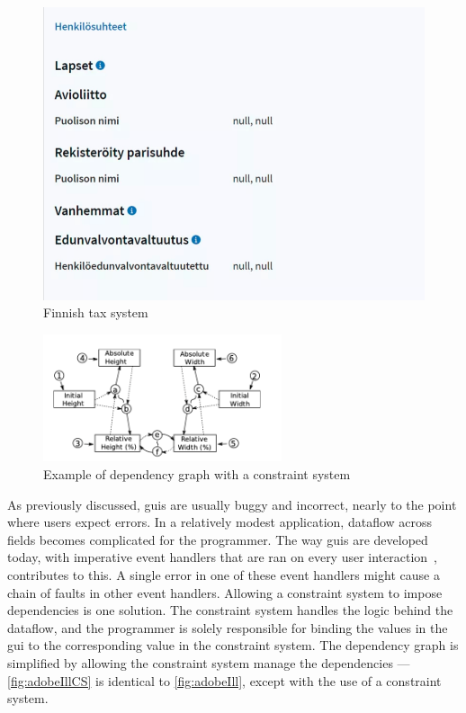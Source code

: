 \begin{figure}
    \centering
    \includegraphics[scale=0.45]{figures/finnishSkatteetaten.png}
    \caption{Finnish tax system}
\end{figure}

\begin{figure}
    \centering
    \includegraphics[width=7cm, frame]{figures/adobeIllCS.png}
    \caption{Example of dependency graph with a constraint system}
    \label{fig:adobeIllCS}
\end{figure}

As previously discussed, \gls{gui}s are usually buggy and incorrect, nearly to the point where users expect errors. In a relatively modest application, dataflow across fields becomes complicated for the programmer. The way \gls{gui}s are developed today, with imperative event handlers that are ran on every user interaction~\cite{all2021multi}, contributes to this. A single error in one of these event handlers might cause a chain of faults in other event handlers. Allowing a constraint system to impose dependencies is one solution. The constraint system handles the logic behind the dataflow, and the programmer is solely responsible for binding the values in the \gls{gui} to the corresponding value in the constraint system. The dependency graph is simplified by allowing the constraint system manage the dependencies --- \autoref{fig:adobeIllCS} is identical to \autoref{fig:adobeIll}, except with the use of a constraint system.

